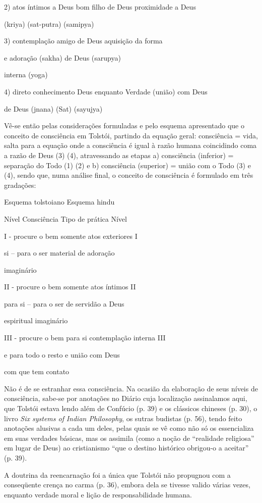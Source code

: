 2) atos íntimos a Deus bom filho de Deus proximidade a Deus

(kriya) (sat-putra) (samipya)

3) contemplação amigo de Deus aquisição da forma

e adoração (sakha) de Deus (sarupya)

interna (yoga)

4) direto conhecimento Deus enquanto Verdade (união) com Deus

de Deus (jnana) (Sat) (sayujya)

Vê-se então pelas considerações formuladas e pelo esquema apresentado
que o conceito de consciência em Tolstói, partindo da equação geral:
consciência = vida, salta para a equação onde a consciência é igual à
razão humana coincidindo coma a razão de Deus (3) (4), atravessando as
etapas a) consciência (inferior) = separação do Todo (1) (2) e b)
consciência (superior) = união com o Todo (3) e (4), sendo que, numa
análise final, o conceito de consciência é formulado em três gradações:

{Esquema tolstoiano} {Esquema hindu}

Nível Consciência Tipo de prática Nível

I - procure o bem somente atos exteriores I

si -- para o ser material de adoração

imaginário

II - procure o bem somente atos íntimos II

para si -- para o ser de servidão a Deus

espiritual imaginário

III - procure o bem para si contemplação interna III

e para todo o resto e união com Deus

com que tem contato

Não é de se estranhar essa consciência. Na ocasião da elaboração de seus
níveis de consciência, sabe-se por anotações no Diário cuja localização
assinalamos aqui, que Tolstói estava lendo além de Confúcio (p. 39) e os
clássicos chineses (p. 30), o livro \emph{Six systems of} \emph{Indian
Philosophy}, os sutras budistas (p. 56), tendo feito anotações alusivas
a cada um deles, pelas quais se vê como não só os essencializa em suas
verdades básicas, mas os assimila (como a noção de ``realidade
religiosa'' em lugar de Deus) ao cristianismo ``que o destino histórico
obrigou-o a aceitar'' (p. 39).

A doutrina da reencarnação foi a única que Tolstói não propugnou com a
conseqüente crença no carma (p. 36), embora dela se tivesse valido
várias vezes, enquanto verdade moral e lição de responsabilidade humana.

